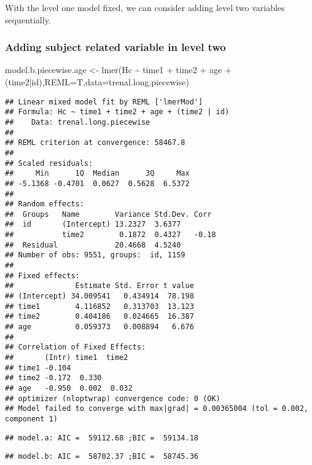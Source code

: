 \documentclass[
]{article}
\newenvironment{Shaded}{\begin{snugshade}}{\end{snugshade}}
\newcommand{\AttributeTok}[1]{\textcolor[rgb]{0.77,0.63,0.00}{#1}}
\newcommand{\FunctionTok}[1]{\textcolor[rgb]{0.00,0.00,0.00}{#1}}
\newcommand{\NormalTok}[1]{#1}
\newcommand{\OtherTok}[1]{\textcolor[rgb]{0.56,0.35,0.01}{#1}}
\newcommand{\SpecialCharTok}[1]{\textcolor[rgb]{0.00,0.00,0.00}{#1}}
\begin{document}
With the level one model fixed, we can consider adding level two
variables sequentially.

\hypertarget{adding-subject-related-variable-in-level-two}{%
\subsubsection{Adding subject related variable in level
two}\label{adding-subject-related-variable-in-level-two}}

\begin{Shaded}
\begin{Highlighting}[]
\NormalTok{model.b.piecewise.age }\OtherTok{\textless{}{-}} \FunctionTok{lmer}\NormalTok{(Hc }\SpecialCharTok{\textasciitilde{}}\NormalTok{ time1 }\SpecialCharTok{+}\NormalTok{ time2 }\SpecialCharTok{+}\NormalTok{ age }\SpecialCharTok{+}\NormalTok{ (time2}\SpecialCharTok{|}\NormalTok{id),}\AttributeTok{REML=}\NormalTok{T,}\AttributeTok{data=}\NormalTok{trenal.long.piecewise)}
\end{Highlighting}
\end{Shaded}

\begin{verbatim}
## Linear mixed model fit by REML ['lmerMod']
## Formula: Hc ~ time1 + time2 + age + (time2 | id)
##    Data: trenal.long.piecewise
## 
## REML criterion at convergence: 58467.8
## 
## Scaled residuals: 
##     Min      1Q  Median      3Q     Max 
## -5.1368 -0.4701  0.0627  0.5628  6.5372 
## 
## Random effects:
##  Groups   Name        Variance Std.Dev. Corr 
##  id       (Intercept) 13.2327  3.6377        
##           time2        0.1872  0.4327   -0.18
##  Residual             20.4668  4.5240        
## Number of obs: 9551, groups:  id, 1159
## 
## Fixed effects:
##              Estimate Std. Error t value
## (Intercept) 34.009541   0.434914  78.198
## time1        4.116852   0.313703  13.123
## time2        0.404186   0.024665  16.387
## age          0.059373   0.008894   6.676
## 
## Correlation of Fixed Effects:
##       (Intr) time1  time2 
## time1 -0.104              
## time2 -0.172  0.330       
## age   -0.950  0.002  0.032
## optimizer (nloptwrap) convergence code: 0 (OK)
## Model failed to converge with max|grad| = 0.00365004 (tol = 0.002, component 1)
\end{verbatim}

\begin{verbatim}
## model.a: AIC =  59112.68 ;BIC =  59134.18
\end{verbatim}

\begin{verbatim}
## model.b: AIC =  58702.37 ;BIC =  58745.36
\end{verbatim}
\end{document}
